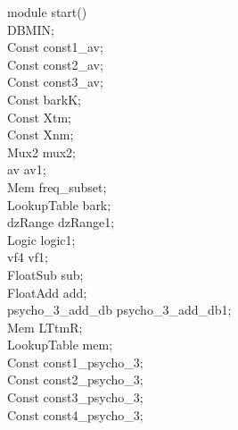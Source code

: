 module start() { \\
\hspace*{2em}DBMIN; \\
\hspace*{2em}Const const1\_av; \\
\hspace*{2em}Const const2\_av; \\
\hspace*{2em}Const const3\_av; \\
\hspace*{2em}Const barkK; \\
\hspace*{2em}Const Xtm; \\
\hspace*{2em}Const Xnm; \\
\hspace*{2em}Mux2 mux2; \\
\hspace*{2em}av av1; \\
\hspace*{2em}Mem freq\_subset; \\
\hspace*{2em}LookupTable bark; \\
\hspace*{2em}dzRange dzRange1; \\
\hspace*{2em}Logic logic1; \\
\hspace*{2em}vf4 vf1; \\
\hspace*{2em}FloatSub sub; \\
\hspace*{2em}FloatAdd add; \\
\hspace*{2em}psycho\_3\_add\_db psycho\_3\_add\_db1; \\
\hspace*{2em}Mem LTtmR; \\
\hspace*{2em}LookupTable mem; \\
\hspace*{2em}Const const1\_psycho\_3;  \\
\hspace*{2em}Const const2\_psycho\_3;  \\
\hspace*{2em}Const const3\_psycho\_3;  \\
\hspace*{2em}Const const4\_psycho\_3; \\
}
